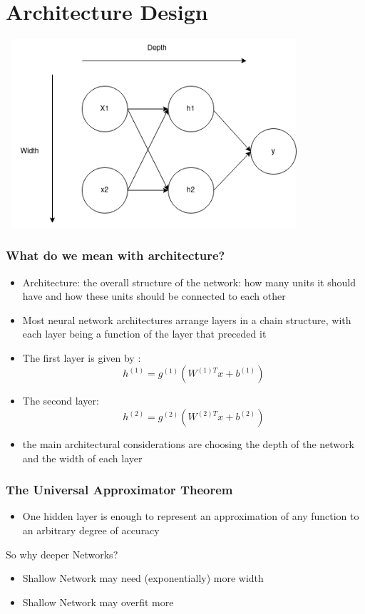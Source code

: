 \documentclass{beamer}
\begin{document}
\section{Architecture Design}
\begin{frame}
	\center 
	\includegraphics[width=110mm , height= 70mm]{width_depth.png}
	
\end{frame}
\begin{frame}
	\frametitle{What do we mean with architecture?}
	\begin{itemize}
		\item Architecture: the overall structure of the network: how many units it should have and how these units should be connected to each other
		\item Most neural network architectures arrange layers in a chain structure, with each layer being a function of the layer that preceded it
		\item The first layer is given by : 
			$$ h^{(1)} = g^{(1)}(W^{(1)T}x + b^{(1)})$$
		\item The second layer: 
			$$ h^{(2)} = g^{(2)}(W^{(2)T}x + b^{(2)})$$
		\item the main architectural considerations are choosing the depth of the network and the width of each layer
	\end{itemize}
\end{frame}
\begin{frame}
	\frametitle{The Universal Approximator Theorem}
	\begin{itemize}
		\item One hidden layer is enough to represent an approximation of any function to an arbitrary degree of accuracy
	\end{itemize}
	\center 
	So why deeper Networks?
	\begin{itemize}
		\item Shallow Network may need (exponentially) more width
		\item Shallow Network may overfit more
	\end{itemize}
\end{frame}
\end{document}
